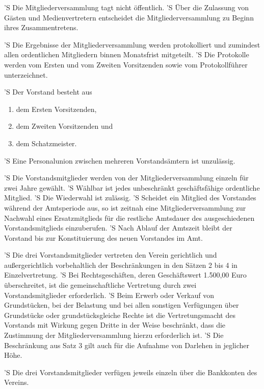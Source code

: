 \documentclass[a4paper,10pt]{scrreprt}
\begin{document}
\begin{contract}
'S Die Mitgliederversammlung tagt nicht öffentlich.
'S Über die Zulassung von Gästen und Medienvertretern entscheidet die
Mitgliederversammlung zu Beginn ihres Zusammentretens.

'S Die Ergebnisse der Mitgliederversammlung werden protokolliert und zumindest
allen ordentlichen Mitgliedern binnen Monatsfrist mitgeteilt.
'S Die Protokolle werden vom Ersten und vom Zweiten Vorsitzenden sowie vom
Protokollführer unterzeichnet.


'S Der Vorstand besteht aus
\begin{enumerate}
	\item dem Ersten Vorsitzenden,
	\item dem Zweiten Vorsitzenden und
	\item dem Schatzmeister.
\end{enumerate}
'S Eine Personalunion zwischen mehreren Vorstandsämtern ist unzulässig.

'S Die Vorstandsmitglieder werden von der Mitgliederversammlung einzeln für
zwei Jahre gewählt.
'S Wählbar ist jedes unbeschränkt geschäftsfähige ordentliche Mitglied.
'S Die Wiederwahl ist zulässig.
'S Scheidet ein Mitglied des Vorstandes während der Amtsperiode aus, so ist
zeitnah eine Mitgliederversammlung zur Nachwahl eines Ersatzmitglieds für die
restliche Amtsdauer des ausgeschiedenen Vorstandsmitglieds einzuberufen.
'S Nach Ablauf der Amtszeit bleibt der Vorstand bis zur Konstituierung des
neuen Vorstandes im Amt.

'S Die drei Vorstandsmitglieder vertreten den Verein gerichtlich und
außergerichtlich vorbehaltlich der Beschränkungen in den Sätzen 2 bis 4 in
Einzelvertretung.
'S Bei Rechtsgeschäften, deren Geschäftswert 1.500,00 Euro überschreitet, ist
die gemeinschaftliche Vertretung durch zwei Vorstandsmitglieder erforderlich.
'S Beim Erwerb oder Verkauf von Grundstücken, bei der Belastung und bei allen
sonstigen Verfügungen über Grundstücke oder grundstücksgleiche Rechte ist die
Vertretungsmacht des Vorstands mit Wirkung gegen Dritte in der Weise
beschränkt, dass die Zustimmung der Mitgliederversammlung hierzu erforderlich
ist.
'S Die Beschränkung aus Satz 3 gilt auch für die Aufnahme von Darlehen in
jeglicher Höhe.

'S Die drei Vorstandsmitglieder verfügen jeweils einzeln über die Bankkonten
des Vereins.


\end{contract}
\end{document}
